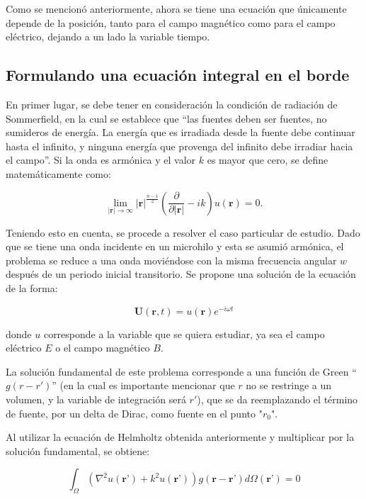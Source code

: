 \documentclass[12pt,letterpaper]{article}
\numberwithin{equation}{section}
\begin{document}
Como se mencionó anteriormente, ahora se tiene una ecuación que únicamente depende de la posición, tanto para el campo magnético como para el campo eléctrico, dejando a un lado la variable tiempo.

\subsection{Formulando una ecuación integral en el borde}
En primer lugar, se debe tener en consideración la condición de radiación de Sommerfield, en la cual se establece que ``las fuentes deben ser fuentes, no sumideros de energía. La energía que es irradiada desde la fuente debe continuar hasta el infinito, y ninguna energía que provenga del infinito debe irradiar hacia el campo''. Si la onda es armónica y el valor $k$ es mayor que cero, se define matemáticamente como:

\begin{equation}
\lim\limits_{|\textbf{r}|\rightarrow\infty}|\textbf{r}|^{\frac{n-1}{2}}\left(\frac{\partial}{\partial|\textbf{r}|}-ik\right)u(\textbf{r})=0.
\label{eq:Sommerfeld radiation condition}
\end{equation} 

Teniendo esto en cuenta, se procede a resolver el caso particular de estudio. Dado que se tiene una onda incidente en un microhilo y esta se asumió armónica, el problema se reduce a una onda moviéndose con la misma frecuencia angular $w$ después de un periodo inicial transitorio. Se propone una solución de la ecuación de la forma:

$$\textbf{U}(\textbf{r},t) = u(\textbf{r})e^{-i\omega t}$$ 

\noindent donde $u$ corresponde a la variable que se quiera estudiar, ya sea el campo eléctrico $E$ o el campo magnético $B$.

La solución fundamental de este problema corresponde a una función de Green ``$g(r-r')$'' (en la cual es importante mencionar que $r$ no se restringe a un volumen, y la variable de integración será $r'$), que se da reemplazando el término de fuente, por un delta de Dirac, como fuente en el punto "$r_{0}$".

Al utilizar la ecuación de Helmholtz obtenida anteriormente y multiplicar por la solución fundamental, se obtiene:

\begin{equation}
\int_{\Omega}(\nabla^2u(\textbf{r'})+k^2u(\textbf{r'}))g(\textbf{r}-\textbf{r'})d\varOmega(\textbf{r'})=0
\label{eq:Helmholtz*Green}
\end{equation}
\end{document}
